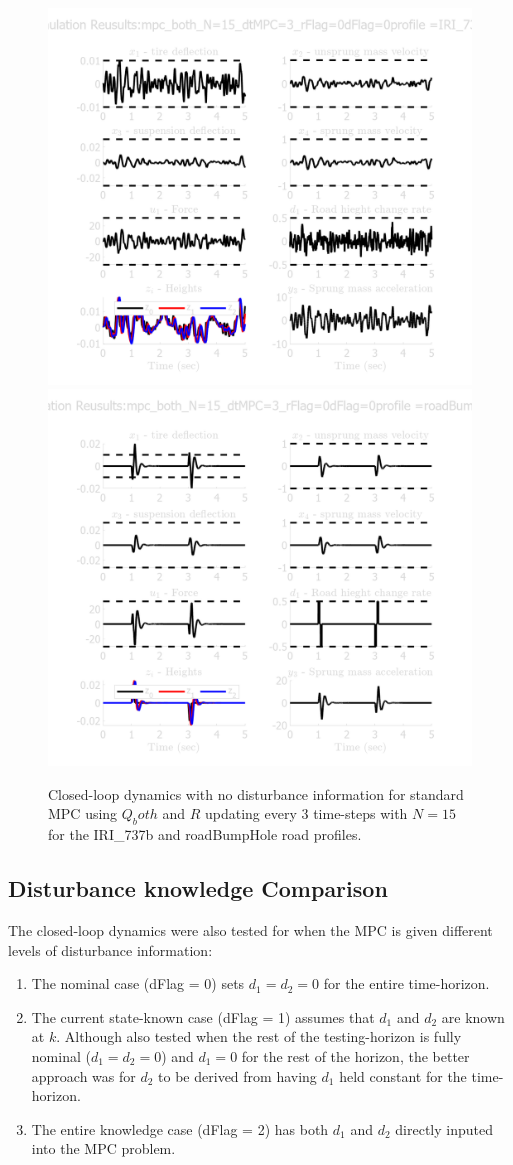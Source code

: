 \documentclass[]{IEEEtran}
\begin{document}
\begin{figure}[h]
    \centering
    \includegraphics[width = 0.49 \columnwidth]{figs/results_mpc_both_N=15_dtMPC=3_rFlag=0_dFlag=0_IRI_737b.png}
    \includegraphics[width = 0.49 \columnwidth]{figs/results_mpc_both_N=15_dtMPC=3_rFlag=0_dFlag=0_roadBumpHole.png}
    \caption{Closed-loop dynamics with no disturbance information for standard MPC using $Q_both$ and $R$ updating every 3 time-steps with $N=15$ for the IRI\_737b and roadBumpHole road profiles.} \label{fig:mpc_N15_dt3_d0_r0}
\end{figure}

\subsection{Disturbance knowledge Comparison}
The closed-loop dynamics were also tested for when the MPC is given different levels of disturbance information:
\begin{enumerate}
    \item The nominal case (dFlag = 0) sets $d_1 = d_2 = 0$ for the entire time-horizon.
    \item The current state-known case (dFlag = 1) assumes that $d_1$ and $d_2$ are known at $k$. Although also tested when the rest of the testing-horizon is fully nominal ($d_1 = d_2 = 0$) and $d_1 = 0$ for the rest of the horizon, the better approach was for $d_2$ to be derived from having $d_1$ held constant for the time-horizon.
    \item The entire knowledge case (dFlag = 2) has both $d_1$ and $d_2$ directly inputed into the MPC problem.
\end{enumerate}
\end{document}
